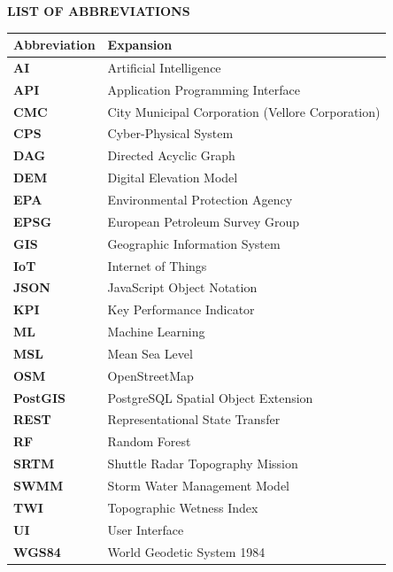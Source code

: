\thispagestyle{plain}
\begin{center}
    {\fontsize{14pt}{18pt}\selectfont \textbf{LIST OF ABBREVIATIONS}\par}
\end{center}
\vspace{0.8cm}

\begin{table}[h!]
\centering
\begin{tabular}{ll}
\textbf{Abbreviation} & \textbf{Expansion} \\
\hline
\textbf{AI} & Artificial Intelligence \\
\textbf{API} & Application Programming Interface \\
\textbf{CMC} & City Municipal Corporation (Vellore Corporation) \\
\textbf{CPS} & Cyber-Physical System \\
\textbf{DAG} & Directed Acyclic Graph \\
\textbf{DEM} & Digital Elevation Model \\
\textbf{EPA} & Environmental Protection Agency \\
\textbf{EPSG} & European Petroleum Survey Group \\
\textbf{GIS} & Geographic Information System \\
\textbf{IoT} & Internet of Things \\
\textbf{JSON} & JavaScript Object Notation \\
\textbf{KPI} & Key Performance Indicator \\
\textbf{ML} & Machine Learning \\
\textbf{MSL} & Mean Sea Level \\
\textbf{OSM} & OpenStreetMap \\
\textbf{PostGIS} & PostgreSQL Spatial Object Extension \\
\textbf{REST} & Representational State Transfer \\
\textbf{RF} & Random Forest \\
\textbf{SRTM} & Shuttle Radar Topography Mission \\
\textbf{SWMM} & Storm Water Management Model \\
\textbf{TWI} & Topographic Wetness Index \\
\textbf{UI} & User Interface \\
\textbf{WGS84} & World Geodetic System 1984 \\
\hline
\end{tabular}
\end{table}

\clearpage
